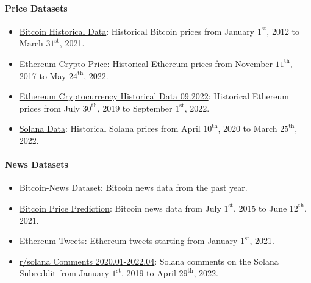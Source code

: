 \documentclass[10pt,twocolumn]{article}
\begin{document}
\paragraph{Price Datasets}
\begin{itemize}
    \item \href{https://www.kaggle.com/datasets/mczielinski/bitcoin-historical-data}{Bitcoin Historical Data}: Historical Bitcoin prices from January $1^{\text{st}}$, 2012 to March $31^{\text{st}}$, 2021.
    \item \href{https://www.kaggle.com/datasets/ranugadisansagamage/ethereum-crypto-price}{Ethereum Crypto Price}: Historical Ethereum prices from November $11^{\text{th}}$, 2017 to May $24^{\text{th}}$, 2022.
    \item \href{https://www.kaggle.com/datasets/psycon/ethusdt-2017-to-2022}{Ethereum Cryptocurrency Historical Data 09.2022}: Historical Ethereum prices from July $30^{\text{th}}$, 2019 to September $1^{\text{st}}$, 2022.
    \item \href{https://www.kaggle.com/datasets/varpit94/solana-data}{Solana Data}: Historical Solana prices from April $10^{\text{th}}$, 2020 to March $25^{\text{th}}$, 2022.
\end{itemize}

\paragraph{News Datasets}
\begin{itemize}
    \item \href{https://www.kaggle.com/datasets/c5e1371384af39901791384a29d20195e0e3d4068b68fb1b12d58caf5a76ff33?select=bitcoin_news_coin_telegraph0.csv}{Bitcoin-News Dataset}: Bitcoin news data from the past year.
    \item \href{https://www.kaggle.com/datasets/c5e1371384af39901791384a29d20195e0e3d4068b68fb1b12d58caf5a76ff33?select=bitcoin_news_coin_telegraph0.csv}{Bitcoin Price Prediction}: Bitcoin news data from July $1^{\text{st}}$, 2015 to June $12^{\text{th}}$, 2021.
    \item \href{https://www.kaggle.com/datasets/mathurinache/ethereum-tweets}{Ethereum Tweets}: Ethereum tweets starting from January $1^{\text{st}}$, 2021.
    \item \href{https://www.kaggle.com/datasets/aglitoiumarius/rsolana-comments-202001202204}{r/solana Comments 2020.01-2022.04}: Solana comments on the Solana Subreddit from January $1^{\text{st}}$, 2019 to April $29^{\text{th}}$, 2022.
\end{itemize}
\end{document}
